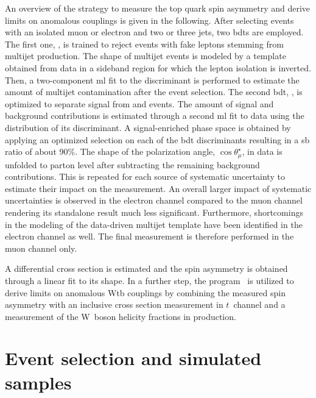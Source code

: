 An overview of the strategy to measure the top quark spin asymmetry and derive limits on anomalous couplings is given in the following. After selecting events with an isolated muon or electron and two or three jets, two \glspl{bdt} are employed. The first one, \bdtqcd, is trained to reject events with fake leptons stemming from multijet production. The shape of multijet events is modeled by a template obtained from data in a sideband region for which the lepton isolation is inverted. Then, a two-component \gls{ml} fit to the \bdtqcd discriminant is performed to estimate the amount of multijet contamination after the event selection. The second \gls{bdt}, \bdttch, is optimized to separate signal from \wjets and \ttbar events. The amount of signal and background contributions is estimated through a second \gls{ml} fit to data using the distribution of its discriminant. A signal-enriched phase space is obtained by applying an optimized selection on each of the \gls{bdt} discriminants resulting in a \gls{sb} ratio of about 90\%. The shape of the polarization angle, $\cos\theta^\star_{\mu}$, in data is unfolded to parton level after subtracting the remaining background contributions. This is repeated for each source of systematic uncertainty to estimate their impact on the measurement. An overall larger impact of systematic uncertainties is observed in the electron channel compared to the muon channel rendering its standalone result much less significant. Furthermore, shortcomings in the modeling of the data-driven multijet template have been identified in the electron channel as well. The final measurement is therefore performed in the muon channel only.

A differential cross section is estimated and the spin asymmetry is obtained through a linear fit to its shape. In a further step, the \TOPFIT program~\cite{topfit} is utilized to derive limits on anomalous Wtb couplings by combining the measured spin asymmetry with an inclusive cross section measurement in $t$~channel and a measurement of the W~boson helicity fractions in \ttbar production.



\section{Event selection and simulated samples}
\label{sec:polarization-selection}

